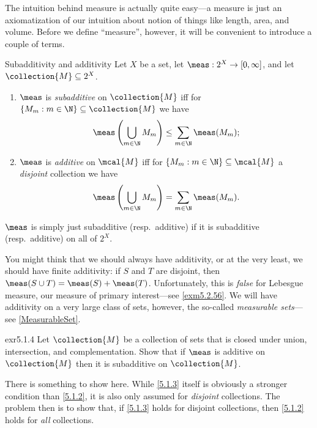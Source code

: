 The intuition behind measure is actually quite easy---a measure is just an axiomatization of our intuition about notion of things like length, area, and volume.  Before we define ``measure'', however, it will be convenient to introduce a couple of terms.
\begin{dfn}{Subadditivity and additivity}{}
Let $X$ be a set, let $\meas :2^X\rightarrow [0,\infty ]$, and let $\collection{M}\subseteq 2^X$.  
\begin{enumerate}
\item $\meas$ is \emph{subadditive} on $\collection{M}$ iff for $\{ M_m:m\in \N \} \subseteq \collection{M}$ we have
\begin{equation}\label{5.1.2}
\meas \left( \bigcup _{m\in \N}M_m\right) \leq \sum _{m\in \N}\meas (M_m);
\end{equation}
\item $\meas$ is \emph{additive} on $\mcal{M}$ iff for $\{ M_m:m\in \N \} \subseteq \mcal{M}$ a \emph{disjoint} collection we have
\begin{equation}\label{5.1.3}
\meas \left( \bigcup _{m\in \N}M_m\right) =\sum _{m\in \N}\meas (M_m).
\end{equation}
\end{enumerate}
$\meas$ is simply just subadditive (resp.~additive) if it is subadditive (resp.~additive) on all of $2^X$.
\begin{rmk}
You might think that we should always have additivity, or at the very least, we should have finite additivity:  if $S$ and $T$ are disjoint, then $\meas (S\cup T)=\meas (S)+\meas (T)$.  Unfortunately, this is \emph{false} for Lebesgue measure, our measure of primary interest---see \cref{exm5.2.56}.  We will have additivity on a very large class of sets, however, the so-called \emph{measurable sets}---see \cref{MeasurableSet}.
\end{rmk}
\end{dfn}
\begin{exr}{}{exr5.1.4}
Let $\collection{M}$ be a collection of sets that is closed under union, intersection, and complementation.  Show that if $\meas$ is additive on $\collection{M}$ then it is subadditive on $\collection{M}$.
\begin{rmk}
There is something to show here.  While \eqref{5.1.3} itself is obviously a stronger condition than \eqref{5.1.2}, it is also only assumed for \emph{disjoint} collections.  The problem then is to show that, if \eqref{5.1.3} holds for disjoint collections, then \eqref{5.1.2} holds for \emph{all} collections.
\end{rmk}
\end{exr}

